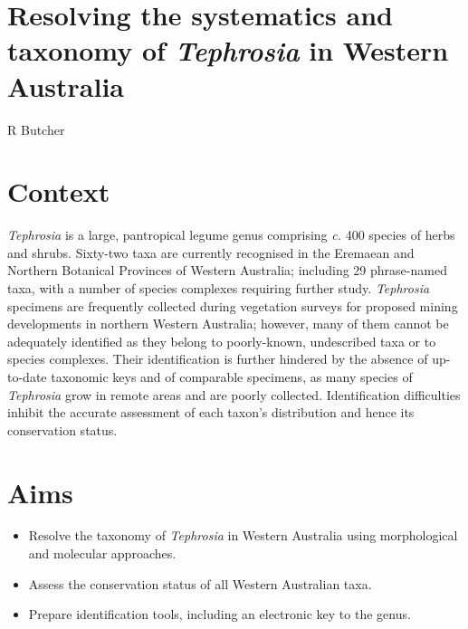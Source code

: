 \documentclass[version=last,
    paper=a4, %
    10pt, %
    usenames,
    dvipsnames,
    oneside, %
    headings=openany, %
    DIV=15 %
]{scrbook}
\begin{document}
\section*{Resolving the systematics and taxonomy of \emph{Tephrosia} in Western
Australia
}

R Butcher


\section*{Context}
\emph{Tephrosia} is a large, pantropical legume genus comprising
\emph{c.} 400 species of herbs and shrubs. Sixty-two taxa are currently
recognised in the Eremaean and Northern Botanical Provinces of Western
Australia; including 29 phrase-named taxa, with a number of species
complexes requiring further study. \emph{Tephrosia} specimens are
frequently collected during vegetation surveys for proposed mining
developments in northern Western Australia; however, many of them cannot
be adequately identified as they belong to poorly-known, undescribed
taxa or to species complexes. Their identification is further hindered
by the absence of up-to-date taxonomic keys and of comparable specimens,
as many species of \emph{Tephrosia} grow in remote areas and are poorly
collected. Identification difficulties inhibit the accurate assessment
of each taxon's distribution and hence its conservation status.



\section*{Aims}
\begin{itemize}
\itemsep1pt\parskip0pt
\item
  Resolve the taxonomy of \emph{Tephrosia} in Western Australia using
  morphological and molecular approaches.
\item
  Assess the conservation status of all Western Australian taxa.
\item
  Prepare identification tools, including an electronic key to the
  genus.
\end{itemize}
\end{document}
